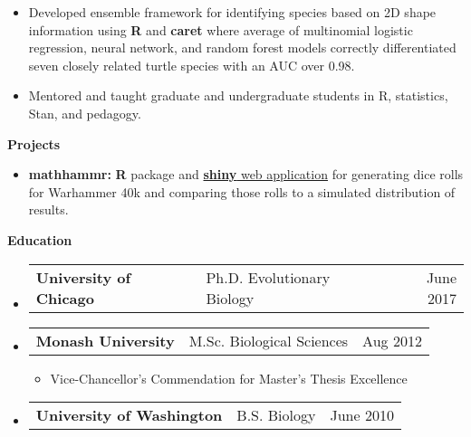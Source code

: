 \documentclass[letterpaper,11pt]{article}
\makeatletter
\newcommand{\resitem}[1]{\item #1 \vspace{-2pt}}
\newcommand{\resheading}[1]{
  {\large \colorbox{mygrey}{\begin{minipage}{\textwidth}{\textbf{#1 \vphantom{p\^{E}}}}\end{minipage}}}
}
\newcommand{\ressubheadingb}[3]{
  \begin{tabular*}{6.5in}{ll@{\extracolsep{\fill}}r}
    \textbf{#1} & \hspace{0.1mm} #2 & #3 \\
\end{tabular*}\vspace{-6pt}}
\makeatother
\begin{document}
\begin{itemize}[itemsep=0mm]
{\begin{itemize}
          \resitem{Developed ensemble framework for identifying species based on 2D shape information using \textbf{R} and \textbf{caret} where average of multinomial logistic regression, neural network, and random forest models correctly differentiated seven closely related turtle species with an AUC over 0.98.}
          \resitem{Mentored and taught graduate and undergraduate students in R, statistics, Stan, and pedagogy.}
      \end{itemize}
    }
\end{itemize}  %
\vspace{0.05in}


\resheading{Projects}
\begin{itemize}[itemsep=-1mm]
  \item \textbf{mathhammr:} \textbf{R} package and \href{https://psmits.shinyapps.io/dice_roller/}{\textbf{shiny} web application} for generating dice rolls for Warhammer 40k and comparing those rolls to a simulated distribution of results.
\end{itemize}


\resheading{Education}
\begin{itemize}
  \item
    \ressubheadingb{University of Chicago}{ Ph.D. Evolutionary Biology}{June 2017}
  \item
    \ressubheadingb{Monash University}{ M.Sc. Biological Sciences}{Aug 2012}
    \begin{itemize}
      \item {\small Vice-Chancellor's Commendation for Master's Thesis Excellence}
    \end{itemize} \vspace{-7.5pt}
  \item
    \ressubheadingb{University of Washington}{ B.S. Biology}{June 2010}
\end{itemize} %



\end{document}
